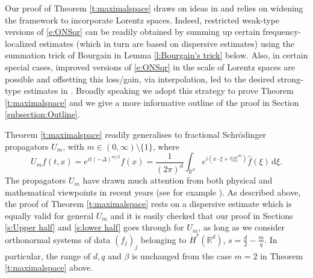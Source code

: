 \documentclass[a4paper]{amsart}
\numberwithin{equation}{section}%
\theoremstyle{plain}%
\theoremstyle{definition}
\theoremstyle{remark}%
\begin{document}
Our proof of Theorem \ref{t:maximalspace} draws on ideas in \cite{BHLNS} and relies on widening the framework to incorporate Lorentz spaces. Indeed, restricted weak-type versions of \eqref{e:ONSqr} can be readily obtained by summing up certain frequency-localized estimates (which in turn are based on dispersive estimates) using the summation trick of Bourgain in Lemma \ref{l:Bourgain's trick} below. Also, in certain special cases, improved versions of \eqref{e:ONSqr} in the scale of Lorentz spaces are possible and offsetting this loss/gain, via interpolation, led to the desired strong-type estimates in \cite{BHLNS}. Broadly speaking we adopt this strategy to prove Theorem \ref{t:maximalspace} and we give a more informative outline of the proof in Section \ref{subsection:Outline}.



Theorem \ref{t:maximalspace} readily generalises to fractional Schr\"odinger propagators $U_m$, with $m \in (0,\infty) \setminus \{1\}$, where
\[
U_m f(t,x) = e^{it(-\Delta)^{m/2}}f(x) = \frac{1}{(2\pi)^d}\int_{\mathbb{R}^d} e^{i(x \cdot \xi + t|\xi|^m)} \widehat{f}(\xi) \, \mathrm{d}\xi.
\]
The propagators $U_m$ have drawn much attention from both physical and mathematical viewpoints in recent years (see for example \cite{IP, Karpman1, Karpman2, KPV, Laskin1, Laskin2}). As described above, the proof of Theorem \ref{t:maximalspace} rests on a dispersive estimate which is equally valid for general $U_m$ and it is easily checked that our proof in Sections \ref{s:Upper half} and \ref{s:lower half} goes through for $U_m$, as long as we consider orthonormal systems of data $(f_j)_j$ belonging to $\dot{H}^{s}(\mathbb{R}^d)$, $s = \frac{d}{2} - \frac{m}{q}$. In particular, the range of $d, q$ and $\beta$ is unchanged from the case $m = 2$ in Theorem \ref{t:maximalspace} above. 
\end{document}
